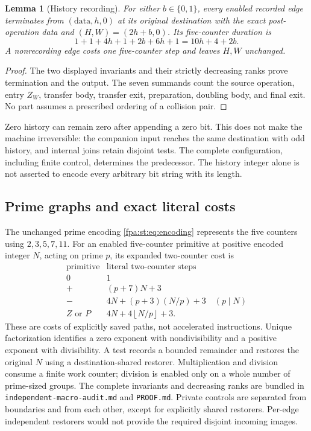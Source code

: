 \documentclass[11pt,a4paper]{article}
\numberwithin{equation}{section}
\newtheorem{lemma}[theorem]{Lemma}
\newcommand{\code}[1]{\texttt{\small #1}}
\newcommand{\floor}[1]{\left\lfloor #1\right\rfloor}
\begin{document}
\begin{lemma}[History recording]
\label{fpa:st:lem:history}
For either $b\in\{0,1\}$, every enabled recorded edge terminates from
$(\text{data},h,0)$ at its original destination with the exact post-operation
data and $(H,W)=(2h+b,0)$. Its five-counter duration is
\begin{equation}
 1+1+4h+1+2b+6h+1=10h+4+2b.
 \label{fpa:st:eq:historyclock}
\end{equation}
A nonrecording edge costs one five-counter step and leaves $H,W$ unchanged.
\end{lemma}
\begin{proof}
The two displayed invariants and their strictly decreasing ranks prove
termination and the output. The seven summands count the source operation,
entry $Z_W$, transfer body, transfer exit, preparation, doubling body, and
final exit. No part assumes a prescribed ordering of a collision pair.
\end{proof}

Zero history can remain zero after appending a zero bit. This does not make
the machine irreversible: the companion input reaches the same destination
with odd history, and internal joins retain disjoint tests. The complete
configuration, including finite control, determines the predecessor. The
history integer alone is not asserted to encode every arbitrary bit string
with its length.

\subsection{Prime graphs and exact literal costs}
The unchanged prime encoding \eqref{fpa:st:eq:encoding} represents the five counters
using $2,3,5,7,11$. For an enabled five-counter primitive at positive encoded
integer $N$, acting on prime $p$, its expanded two-counter cost is
\begin{equation}
\begin{array}{c|l}
\text{primitive} & \text{literal two-counter steps}\\\hline
0 & 1\\
+ & (p+7)N+3\\
- & 4N+(p+3)(N/p)+3 \quad (p\mid N)\\
Z\text{ or }P & 4N+4\floor{N/p}+3.
\end{array}
\label{fpa:st:eq:primeclocks}
\end{equation}
These are costs of explicitly saved paths, not accelerated instructions.
Unique factorization identifies a zero exponent with nondivisibility and a
positive exponent with divisibility. A test records a bounded remainder and
restores the original $N$ using a destination-shared restorer. Multiplication
and division consume a finite work counter; division is enabled only on a
whole number of prime-sized groups. The complete invariants and decreasing
ranks are bundled in \code{independent-macro-audit.md} and \code{PROOF.md}.
Private controls are separated from boundaries and from each other, except
for explicitly shared restorers. Per-edge independent restorers would not
provide the required disjoint incoming images.
\end{document}
